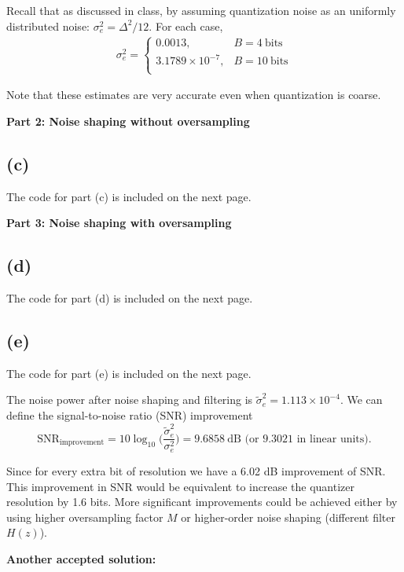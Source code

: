 \documentclass{article}
\begin{document}
Recall that as discussed in class, by assuming quantization noise as an uniformly distributed noise: $\sigma_e^2 = \Delta^2/12$. For each case,
\begin{align*}
\sigma_e^2 = \begin{cases}
0.0013, & B = 4~\text{bits} \\
3.1789\times 10^{-7}, & B = 10~\text{bits} \\
\end{cases}
\end{align*}

Note that these estimates are very accurate even when quantization is coarse. 

\noindent\textbf{Part 2: Noise shaping without oversampling}
\subsection{(c)}

The code for part (c) is included on the next page.

\noindent\textbf{Part 3: Noise shaping with oversampling}
\subsection{(d)}

The code for part (d) is included on the next page.

\subsection{(e)}

The code for part (e) is included on the next page.

The noise power after noise shaping and filtering is $\tilde{\sigma}_e^2 = 1.113\times 10^{-4}$. We can define the signal-to-noise ratio (SNR) improvement 
\begin{equation}
\text{SNR}_{\text{improvement}} = 10\log_{10}\Big(\frac{\tilde{\sigma}_e^2}{\sigma_e^2}\Big) = 9.6858~\text{dB (or 9.3021 in linear units)}.
\end{equation}

Since for every extra bit of resolution we have a 6.02 dB improvement of SNR. This improvement in SNR would be equivalent to increase the quantizer resolution by 1.6 bits. More significant improvements could be achieved either by using higher oversampling factor $M$ or higher-order noise shaping (different filter $H(z)$).

\noindent\textbf{Another accepted solution:}
\end{document}
